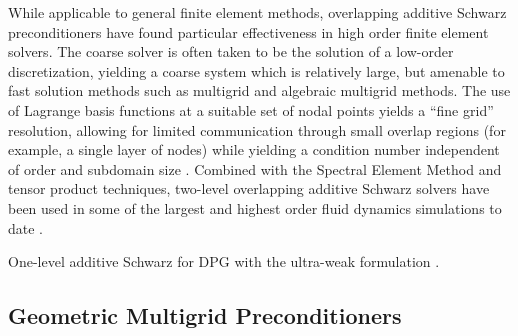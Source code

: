 While applicable to general finite element methods, overlapping additive Schwarz preconditioners have found particular effectiveness in high order finite element solvers.  The coarse solver is often taken to be the solution of a low-order discretization, yielding a coarse system which is relatively large, but amenable to fast solution methods such as multigrid and algebraic multigrid methods.  The use of Lagrange basis functions at a suitable set of nodal points yields a ``fine grid'' resolution, allowing for limited communication through small overlap regions (for example, a single layer of nodes) while yielding a condition number independent of order and subdomain size \cite{canuto2007spectral}.  Combined with the Spectral Element Method and tensor product techniques, two-level overlapping additive Schwarz solvers have been used in some of the largest and highest order fluid dynamics simulations to date  \cite{fischer1997overlapping}.  


One-level additive Schwarz for DPG with the ultra-weak formulation \cite{barker2011overlapping}.  

\subsection{Geometric Multigrid Preconditioners}

\cite{WienersWohlmuth}

